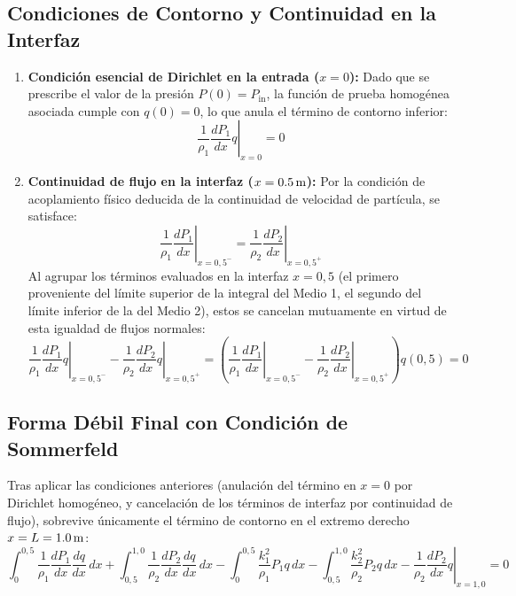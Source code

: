\documentclass[11pt,letterpaper]{article}
\begin{document}
\subsection{Condiciones de Contorno y Continuidad en la Interfaz}

\begin{enumerate}
    \item \textbf{Condición esencial de Dirichlet en la entrada ($x = 0$):}
    Dado que se prescribe el valor de la presión $P(0) = P_{\text{in}}$, la función de prueba homogénea asociada cumple con $q(0) = 0$, lo que anula el término de contorno inferior:
    \begin{equation}
        \left. \frac{1}{\rho_1} \frac{dP_1}{dx} q \right|_{x=0} = 0
    \end{equation}

    \item \textbf{Continuidad de flujo en la interfaz ($x = \text{\qty{0,5}{\metre}}$):}
    Por la condición de acoplamiento físico deducida de la continuidad de velocidad de partícula, se satisface:
    \begin{equation}
        \left. \frac{1}{\rho_1} \frac{dP_1}{dx} \right|_{x=0{,}5^-} = \left. \frac{1}{\rho_2} \frac{dP_2}{dx} \right|_{x=0{,}5^+}
    \end{equation}
    Al agrupar los términos evaluados en la interfaz $x = 0{,}5$ (el primero proveniente del límite superior de la integral del Medio 1, el segundo del límite inferior de la del Medio 2), estos se cancelan mutuamente en virtud de esta igualdad de flujos normales:
    \begin{equation}
        \left. \frac{1}{\rho_1} \frac{dP_1}{dx} q \right|_{x=0{,}5^-} - \left. \frac{1}{\rho_2} \frac{dP_2}{dx} q \right|_{x=0{,}5^+} = \left( \left. \frac{1}{\rho_1} \frac{dP_1}{dx} \right|_{x=0{,}5^-} - \left. \frac{1}{\rho_2} \frac{dP_2}{dx} \right|_{x=0{,}5^+} \right) q(0{,}5) = 0
    \end{equation}
\end{enumerate}

\subsection{Forma Débil Final con Condición de Sommerfeld}

Tras aplicar las condiciones anteriores (anulación del término en $x=0$ por Dirichlet homogéneo, y cancelación de los términos de interfaz por continuidad de flujo), sobrevive únicamente el término de contorno en el extremo derecho $x = L = \text{\qty{1,0}{\metre}}$:
\begin{equation}
    \int_0^{0{,}5} \frac{1}{\rho_1} \frac{dP_1}{dx} \frac{dq}{dx} \, dx + \int_{0{,}5}^{1{,}0} \frac{1}{\rho_2} \frac{dP_2}{dx} \frac{dq}{dx} \, dx - \int_0^{0{,}5} \frac{k_1^2}{\rho_1} P_1 q \, dx - \int_{0{,}5}^{1{,}0} \frac{k_2^2}{\rho_2} P_2 q \, dx - \left. \frac{1}{\rho_2} \frac{dP_2}{dx} q \right|_{x=1{,}0} = 0
\end{equation}
\end{document}
